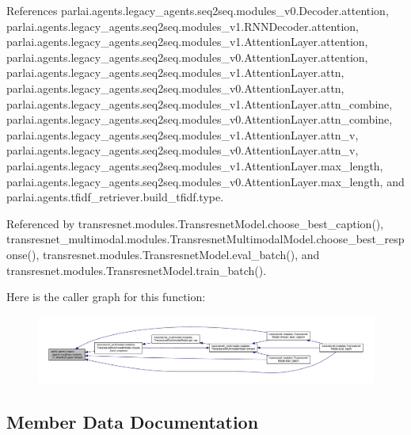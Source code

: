 References parlai.\+agents.\+legacy\+\_\+agents.\+seq2seq.\+modules\+\_\+v0.\+Decoder.\+attention, parlai.\+agents.\+legacy\+\_\+agents.\+seq2seq.\+modules\+\_\+v1.\+R\+N\+N\+Decoder.\+attention, parlai.\+agents.\+legacy\+\_\+agents.\+seq2seq.\+modules\+\_\+v1.\+Attention\+Layer.\+attention, parlai.\+agents.\+legacy\+\_\+agents.\+seq2seq.\+modules\+\_\+v0.\+Attention\+Layer.\+attention, parlai.\+agents.\+legacy\+\_\+agents.\+seq2seq.\+modules\+\_\+v1.\+Attention\+Layer.\+attn, parlai.\+agents.\+legacy\+\_\+agents.\+seq2seq.\+modules\+\_\+v0.\+Attention\+Layer.\+attn, parlai.\+agents.\+legacy\+\_\+agents.\+seq2seq.\+modules\+\_\+v1.\+Attention\+Layer.\+attn\+\_\+combine, parlai.\+agents.\+legacy\+\_\+agents.\+seq2seq.\+modules\+\_\+v0.\+Attention\+Layer.\+attn\+\_\+combine, parlai.\+agents.\+legacy\+\_\+agents.\+seq2seq.\+modules\+\_\+v1.\+Attention\+Layer.\+attn\+\_\+v, parlai.\+agents.\+legacy\+\_\+agents.\+seq2seq.\+modules\+\_\+v0.\+Attention\+Layer.\+attn\+\_\+v, parlai.\+agents.\+legacy\+\_\+agents.\+seq2seq.\+modules\+\_\+v1.\+Attention\+Layer.\+max\+\_\+length, parlai.\+agents.\+legacy\+\_\+agents.\+seq2seq.\+modules\+\_\+v0.\+Attention\+Layer.\+max\+\_\+length, and parlai.\+agents.\+tfidf\+\_\+retriever.\+build\+\_\+tfidf.\+type.



Referenced by transresnet.\+modules.\+Transresnet\+Model.\+choose\+\_\+best\+\_\+caption(), transresnet\+\_\+multimodal.\+modules.\+Transresnet\+Multimodal\+Model.\+choose\+\_\+best\+\_\+response(), transresnet.\+modules.\+Transresnet\+Model.\+eval\+\_\+batch(), and transresnet.\+modules.\+Transresnet\+Model.\+train\+\_\+batch().

Here is the caller graph for this function\+:
\nopagebreak
\begin{figure}[H]
\begin{center}
\leavevmode
\includegraphics[width=350pt]{classparlai_1_1agents_1_1legacy__agents_1_1seq2seq_1_1modules__v1_1_1AttentionLayer_ad6041bd52e148a4dfe894b71f79937c0_icgraph}
\end{center}
\end{figure}


\subsection{Member Data Documentation}
\mbox{\label{classparlai_1_1agents_1_1legacy__agents_1_1seq2seq_1_1modules__v1_1_1AttentionLayer_a6c95b5fa079109f57c305954f1f1465a}} 
